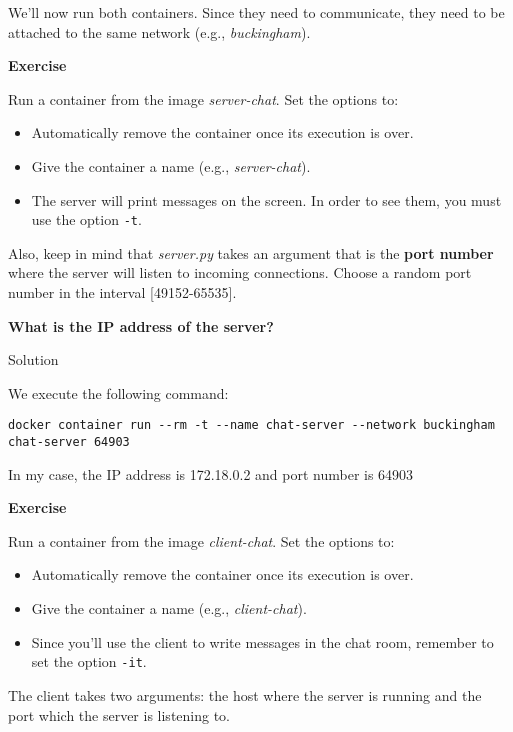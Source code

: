 \documentclass[
]{article}
\newenvironment{infobox}[1]
  {
  \begin{itemize}
  \renewcommand{\labelitemi}{
    \raisebox{-.7\height}[0pt][0pt]{
      
    }
  }
  \setlength{\fboxsep}{1em}
  \begin{whitebox}
  \item
  }
  {
  \end{whitebox}
  \end{itemize}
  }
\theoremstyle{definition}
\theoremstyle{definition}
\theoremstyle{definition}
\theoremstyle{remark}
\let\BeginKnitrBlock\begin \let\EndKnitrBlock\end
\begin{document}
We'll now run both containers.
Since they need to communicate, they need to be attached to the same
network (e.g., \emph{buckingham}).

\begin{infobox}{exercisebox}

\textbf{Exercise}

\BeginKnitrBlock{exercise}
\protect\hypertarget{exr:unnamed-chunk-40}{}{\label{exr:unnamed-chunk-40} }Run a container from the image \emph{server-chat}.
Set the options to:

\begin{itemize}
\item
  Automatically remove the container once its execution is over.
\item
  Give the container a name (e.g., \emph{server-chat}).
\item
  The server will print messages on the screen.
  In order to see them, you must use the option \texttt{-t}.
\end{itemize}

Also, keep in mind that \emph{server.py} takes an argument
that is the \textbf{port number} where the server will listen to incoming connections.
Choose a random port number in the interval {[}49152-65535{]}.

\textbf{What is the IP address of the server?}
\EndKnitrBlock{exercise}

\end{infobox}

Solution

\begin{infobox}{exercisebox}

We execute the following command:

\begin{verbatim}
docker container run --rm -t --name chat-server --network buckingham chat-server 64903
\end{verbatim}

In my case, the IP address is 172.18.0.2 and port number is 64903

\end{infobox}

\begin{infobox}{exercisebox}

\textbf{Exercise}

\BeginKnitrBlock{exercise}
\protect\hypertarget{exr:unnamed-chunk-41}{}{\label{exr:unnamed-chunk-41} }
Run a container from the image \emph{client-chat}.
Set the options to:

\begin{itemize}
\item
  Automatically remove the container once its execution is over.
\item
  Give the container a name (e.g., \emph{client-chat}).
\item
  Since you'll use the client to write messages in the chat room,
  remember to set the option \texttt{-it}.
\end{itemize}

The client takes two arguments: the host where the server is running
and the port which the server is listening to.
\EndKnitrBlock{exercise}

\end{infobox}
\end{document}
